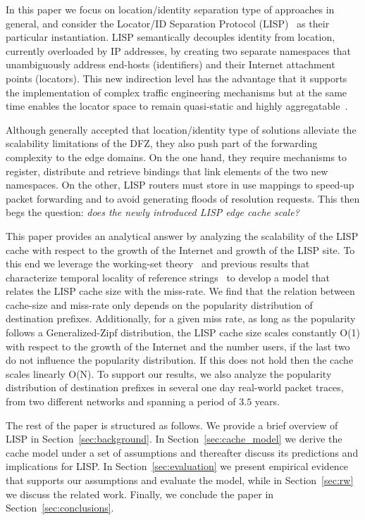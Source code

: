 \documentclass[twocolumn, 10pt]{article}
\theoremstyle{plain}
\begin{document}
In this paper we focus on location/identity separation type of approaches in
general, and  consider the Locator/ID Separation Protocol
(LISP)~\cite{saucez:lisp} as their particular instantiation. LISP semantically
decouples identity from location, currently overloaded by IP addresses, by
creating two separate namespaces that unambiguously address end-hosts
(identifiers) and their Internet attachment points (locators). This new
indirection level has the advantage that it supports the implementation of
complex traffic engineering mechanisms but at the same time enables the
locator space to remain quasi-static and highly
aggregatable~\cite{rfc7215}. 



Although generally accepted that location/identity type of solutions alleviate the
scalability limitations of the DFZ, they also push part of the forwarding
complexity to the edge domains. On the one hand, they require mechanisms to
register, distribute and retrieve bindings that link elements of the two new
namespaces. On the other, LISP routers must store in use mappings to speed-up
packet forwarding and to avoid generating floods of resolution requests. 
This then begs the question: \emph{does the newly introduced LISP edge cache
scale?}




This paper provides an analytical answer by analyzing the scalability of the
LISP cache with respect to the growth of the Internet and growth of the LISP
site. To this end we leverage the working-set theory~\cite{denning:ws_model}
and previous results that characterize temporal locality of reference
strings~\cite{breslau:web_and_zipf, jin:web_tloc} to develop a model that
relates the LISP cache size with the miss-rate. We find that the relation
between cache-size and miss-rate only depends on the popularity distribution
of destination prefixes. Additionally, for a given miss rate, as long as the
popularity follows a Generalized-Zipf distribution, the LISP cache size scales
constantly O(1) with respect to the growth of the Internet and the number
users, if the last two do not influence the popularity distribution. If this
does not hold then the cache scales linearly O(N). To support our results, we
also analyze the popularity distribution of destination prefixes in several one day
real-world packet traces, from two different networks and spanning a period of
$3.5$ years.

The rest of the paper is structured as follows. We provide a brief overview of
LISP in Section~\ref{sec:background}. In Section~\ref{sec:cache_model} we
derive the cache model under a set of assumptions and thereafter discuss its
predictions and implications for LISP.  In Section~\ref{sec:evaluation}
we present empirical evidence that supports our assumptions and evaluate the
model, while in Section~\ref{sec:rw} we discuss the related work. Finally, we
conclude the paper in Section~\ref{sec:conclusions}.
 
\end{document}
